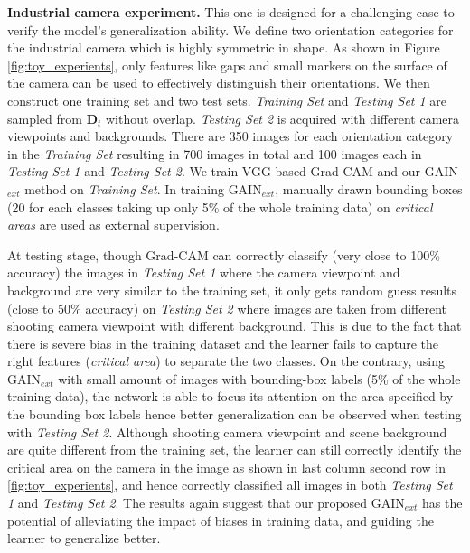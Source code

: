 \documentclass[10pt,twocolumn,letterpaper]{article}
\begin{document}
\textbf{Industrial camera experiment.} This one is designed for a challenging case to verify the model's generalization ability. We define two orientation categories for the industrial camera which is highly symmetric in shape. As shown in Figure \ref{fig:toy_experients}, only features like gaps and small markers on the surface of the camera can be used to effectively distinguish their orientations. We then construct one training set and two test sets. \textit{Training Set} and \textit{Testing Set 1} are sampled from $\textbf{D}_t$ without overlap. \textit{Testing Set 2} is acquired with different camera viewpoints and backgrounds. There are 350 images for each orientation category in the \emph{Training Set}  resulting in 700 images in total and 100 images each in \emph{Testing Set 1} and \emph{Testing Set 2}. We train VGG-based Grad-CAM and our GAIN$_{ext}$ method on \emph{Training Set}. In training GAIN$_{ext}$, manually drawn bounding boxes (20 for each classes taking up only 5\% of the whole training data) on \textit{critical areas} are used as external supervision.

At testing stage, though Grad-CAM can correctly classify (very close to 100\% accuracy) the images in \emph{Testing Set 1} where the camera viewpoint and background are very similar to the training set, it only gets random guess results (close to 50\% accuracy) on \emph{Testing Set 2} where images are taken from different shooting camera viewpoint with different background. This is due to the fact that there is severe bias in the training dataset and the learner fails to capture the right features (\textit{critical area}) to separate the two classes. On the contrary, using GAIN$_{ext}$ with small amount of images with bounding-box labels (5\% of the
whole training data), the network is able to focus its attention on the area specified by the bounding box labels hence better generalization can be observed when testing with \emph{Testing Set 2}. Although shooting camera viewpoint and scene background are quite different from the training set, the learner can still correctly identify the critical area on the camera in the image as shown in last column second row in \ref{fig:toy_experients}, and hence correctly classified all images in both \emph{Testing Set 1} and \emph{Testing Set 2}. The results again suggest that our proposed GAIN$_{ext}$ has the potential of alleviating the impact of biases in training data, and guiding the learner to generalize better.
\end{document}
